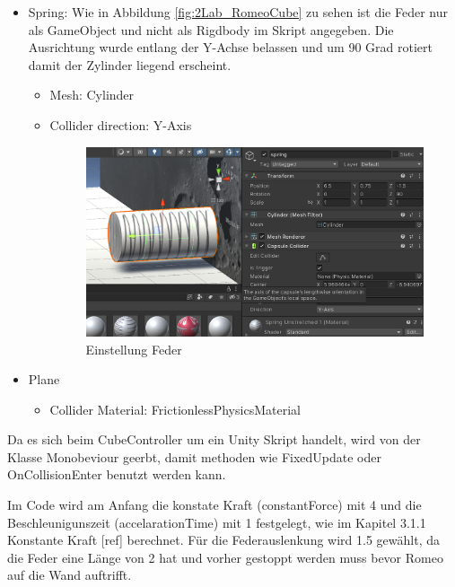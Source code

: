 \documentclass[../main.tex]{subfiles}
\begin{document}
\begin{itemize}
    \item Spring:
    \newline Wie in Abbildung \ref{fig:2Lab_RomeoCube} zu sehen ist die Feder nur als GameObject und nicht als Rigdbody im Skript angegeben. Die Ausrichtung wurde entlang der Y-Achse belassen und um 90 Grad rotiert damit der Zylinder liegend erscheint.
    \begin{itemize}
        \item Mesh: Cylinder
        \item Collider direction: Y-Axis
        \begin{figure}[H]
            \begin{center}
            \centerline{\includegraphics[width=100mm]{./images/2Lab_Spring.PNG}}
                \caption{Einstellung Feder}
                \label{fig:2Lab_Spring}
            \end{center}
        \end{figure}
    \end{itemize}

    \item Plane
    \begin{itemize}
        \item Collider Material: FrictionlessPhysicsMaterial
    \end{itemize}
\end{itemize}

\newpage
Da es  sich beim CubeController um ein Unity Skript handelt, wird von der Klasse Monobeviour geerbt, damit methoden wie FixedUpdate oder OnCollisionEnter benutzt werden kann.

Im Code wird am Anfang die konstate Kraft (constantForce) mit 4 und die Beschleunigunszeit (accelarationTime) mit 1 festgelegt, wie im Kapitel 3.1.1 Konstante Kraft [ref] berechnet. Für die Federauslenkung wird 1.5 gewählt, da die Feder eine Länge von 2 hat und vorher gestoppt werden muss bevor Romeo auf die Wand auftrifft.
\end{document}
